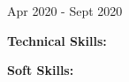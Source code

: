 

\begin{cventries}

  \cventry
    {} %
    {} %
    {} %
    {Apr 2020 - Sept 2020} %
    {
      \begin{cvitems} %
        \item {}
        \item {}
        \item {}
        \item {\textbf{Technical Skills:} }
        \item {\textbf{Soft Skills:} }
      \end{cvitems}
    }

\end{cventries}
